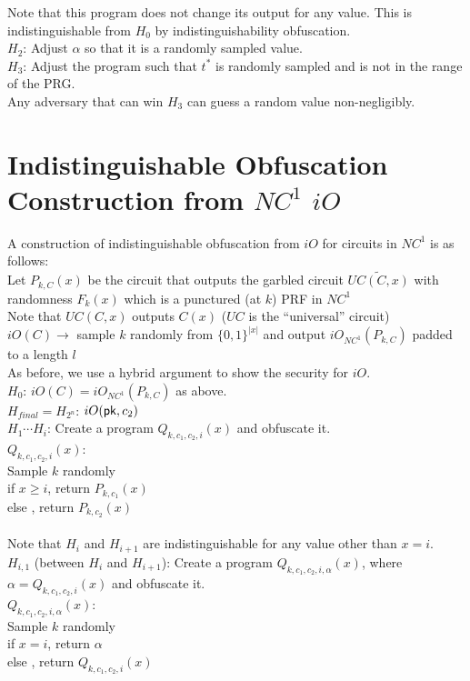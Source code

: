 \noindent Note that this program does not change its output for any value. This is indistinguishable from $H_0$  by indistinguishability obfuscation.\\

\noindent $H_2$: Adjust $\alpha$ so that it is a randomly sampled value.\\
\noindent $H_3$: Adjust the program such that $t^*$ is randomly sampled and is not in the range of the PRG.\\

Any adversary that can win $H_3$ can guess a random value non-negligibly.\\

\section{Indistinguishable Obfuscation Construction from $NC^1$ $iO$}
A construction of indistinguishable obfuscation from $iO$ for circuits in $NC^1$ is as follows:\\
Let $P_{k,C}(x)$ be the circuit that outputs the garbled circuit $\widetilde{UC(C,x)}$ with randomness $F_k(x)$ which is a punctured (at $k$) PRF in $NC^1$\\
\indent Note that $UC(C,x)$ outputs $C(x)$ ($UC$ is the ``universal'' circuit)\\
$iO(C) \rightarrow $ sample $k$ randomly from $\{0,1\}^{|x|}$ and output $iO_{NC^1}(P_{k,C})$ padded to a length $l$\\

As before, we use a hybrid argument to show the security for $iO$.\\
\noindent $H_0$: $iO(C) = iO_{NC^1}(P_{k,C})$ as above.\\
\noindent $H_{final} = H_{2^n}$: $iO(\mathsf{pk}, c_2)$\\
\noindent $H_1 \cdots H_i$: Create a program $Q_{k, c_1, c_2, i}(x)$ and obfuscate it.\\
$Q_{k,c_1,c_2,i}(x)$:\\
\indent Sample $k$ randomly\\
\indent if $x \ge i$, return $P_{k,c_1}(x)$\\
\indent else , return $P_{k,c_2}(x)$\\\\
\noindent Note that $H_i$ and $H_{i+1}$ are indistinguishable for any value other than $x=i$.\\
\noindent $H_{i,1}$ (between $H_i$ and $H_{i+1}$): Create a program $Q_{k, c_1, c_2, i, \alpha}(x)$, where $\alpha = Q_{k, c_1, c_2, i}(x)$ and obfuscate it.\\
$Q_{k, c_1, c_2, i, \alpha}(x)$:\\
\indent Sample $k$ randomly\\
\indent if $x = i$, return $\alpha$\\
\indent else , return $Q_{k,c_1,c_2, i}(x)$\\

